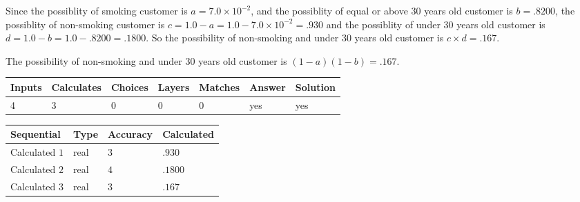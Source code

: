 \documentclass[12pt]{article}
\begin{document}
 

Since the possiblity of  %
smoking customer is $ a =  %
7.0 \times 10^{-2} $,
and the possiblity of  %
equal or above 30 years old customer is $ b =  %
.8200 $,
the possiblity of  %
non-smoking customer is $ c = 1.0 - a = 1.0 -
7.0 \times 10^{-2}
=  %
.930 $ and the possiblity of  %
under 30 years old
customer is $ d = 1.0 - b = 1.0 -  %
.8200 =  %
.1800  $.
So the possibility of  %
 non-smoking and  %
under 30 years old
customer is $ c \times d =  %
.167 $.
 
 
 
\noindent{}
 
 

 
 
 
\noindent{}
 
 

The possibility of  %
 non-smoking and  %
under 30 years old
customer is $ (1-a)(1-b) =  %
.167 $.
 
 
\noindent{}
 
 

 
\vspace{0.3in}
   
   
   
   
\noindent\begin{tabular}{|l|l|l|l|l|l|l|}
 \hline
Inputs & Calculates & Choices & Layers & Matches & Answer & Solution \\ \hline
           4 & 
           3 & 
           0
  & 
           0 & 
           0 & 
  yes & 
  yes 
  \\ \hline
 \end{tabular}
   
   
   
   
\noindent{}
   
   
  
  
\noindent\begin{tabular}{|l|l|l|l|}
\hline
 Sequential & Type & Accuracy & Calculated \\ 
\hline
 
 
  Calculated $           1$ & real & $           3 $ & 
 $ .930 $ 
 \\  \hline  
 
 
  Calculated $           2$ & real & $           4 $ & 
 $ .1800 $ 
 \\  \hline  
 
 
  Calculated $           3$ & real & $           3 $ & 
 $ .167 $ 
 \\  \hline  
 \end{tabular}
   
\end{document}
